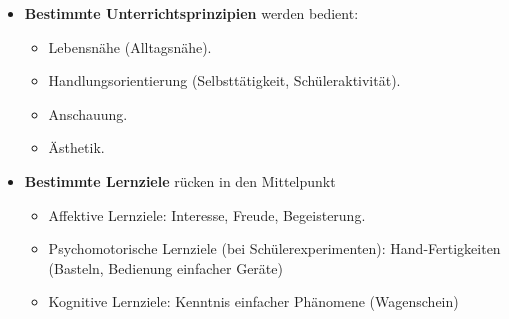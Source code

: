 \begin{itemize}
	\item
	{\bf Bestimmte Unterrichtsprinzipien} werden bedient:
	\begin{itemize}
		\item
		Lebensn\"{a}he (Alltagsn\"{a}he).
		\item
		Handlungsorientierung (Selbstt\"{a}tigkeit, Sch\"{u}leraktivit\"{a}t).
		\item
		Anschauung.
		\item
		\"{A}sthetik.
		\end{itemize}
		
		\item
		{\bf Bestimmte Lernziele} r\"{u}cken in den Mittelpunkt
		\begin{itemize}
		\item
		Affektive Lernziele: Interesse, Freude, Begeisterung.
		\item
		Psychomotorische Lernziele (bei Sch\"{u}lerexperimenten):
		Hand-Fertigkeiten (Basteln, Bedienung einfacher Ger\"{a}te)
		\item
		Kognitive Lernziele: Kenntnis einfacher Ph\"{a}nomene (Wagenschein)
	\end{itemize}
\end{itemize}

